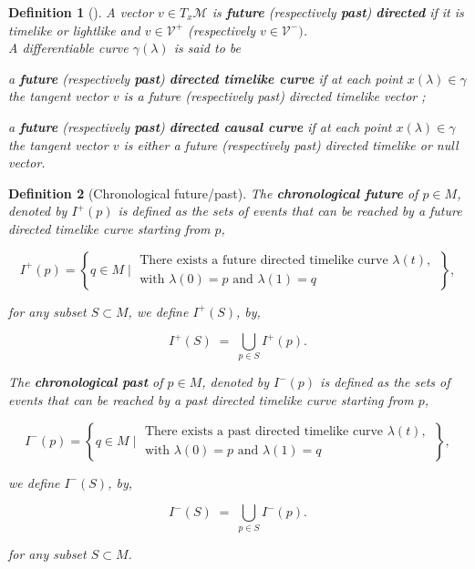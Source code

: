 \documentclass[10pt]{book}
\newcommand{\Mcal}{\mathcal{M}}
\newcommand{\Vcal}{\mathcal{V}}
\theoremstyle{break}
\newtheorem{definition}{Definition}
\begin{document}
\begin{definition}[]
A vector $v \in T_x\Mcal$ is \textbf{future} (respectively \textbf{past}) \textbf{directed} if it is timelike or lightlike and $v \in \Vcal^+$ (respectively $v \in \Vcal^-)$. \\[3pt]
A differentiable curve $\gamma(\lambda)$ is said to be 

\begin{description}
\item a \textbf{future} (respectively \textbf{past}) \textbf{directed timelike curve} if at each point $x(\lambda) \in \gamma$ the tangent vector $v$ is a future (respectively past) directed timelike vector ;
\item a \textbf{future} (respectively \textbf{past}) \textbf{directed causal curve} if at each point $x(\lambda) \in \gamma$ the tangent vector $v$ is either a future (respectively past) directed timelike or null vector. 
\end{description} 

\end{definition}

\begin{definition}[Chronological future/past]
The \textbf{chronological future} of $p \in M$, denoted by $I^{+}(p)$ is defined as the sets of events that can be reached by a future directed timelike curve starting from $p$,

\begin{equation*}
I^{+}(p) = \left\{ q \in M \; \bigg| \; \begin{array}{l} \text{There exists a future directed timelike curve $\lambda(t)$,} \\ \text{with $\lambda(0)=p$ and $\lambda(1)=q$} \end{array} \; \right\},
\end{equation*}

for any subset $S \subset M$, we define $I^{+}(S)$, by,

\begin{equation*}
I^{+}(S) \; = \; \bigcup_{p \in S} I^{+}(p). 
\end{equation*}

The \textbf{chronological past} of $p \in M$, denoted by $I^{-}(p)$ is defined as the sets of events that can be reached by a past directed timelike curve starting from $p$,

\begin{equation*}
I^{-}(p) = \left\{ q \in M \; \bigg| \; \begin{array}{l} \text{There exists a past directed timelike curve $\lambda(t)$,} \\ \text{with $\lambda(0)=p$ and $\lambda(1)=q$} \end{array} \; \right\},
\end{equation*}

we define $I^{-}(S)$, by,

\begin{equation*}
I^{-}(S) \; = \; \bigcup_{p \in S} I^{-}(p). 
\end{equation*}

for any subset $S \subset M$. 

\end{definition}
\end{document}
